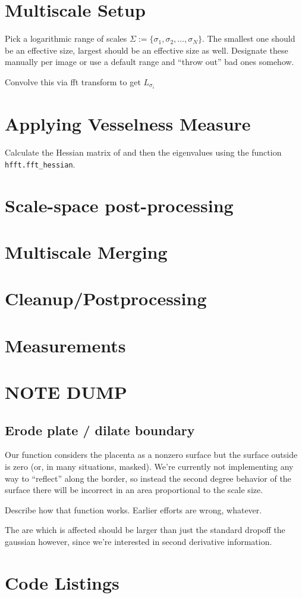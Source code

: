 \section{Multiscale Setup}

	Pick a logarithmic range of scales $\Sigma := \{ \sigma_1, \sigma_2, \dots, \sigma_N\}$.
	The smallest one should be an effective size, largest should be an effective size as well. Designate these manually per image or use a default range and ``throw out'' bad ones somehow.
	
	Convolve this via fft transform to get $L_{\sigma_i}$
	
\section{Applying Vesselness Measure}
Calculate the Hessian matrix of  and then the eigenvalues using the function \texttt{hfft.fft\_hessian}.

\section{Scale-space post-processing}
\section{Multiscale Merging}
\section{Cleanup/Postprocessing}
\section{Measurements}

\section{NOTE DUMP}
	
	\subsection{Erode plate / dilate boundary}
	
	Our function considers the placenta as a nonzero surface but the surface outside is zero (or, in many situations, masked). We're currently not implementing any way to ``reflect'' along the border, so instead the second degree behavior of the surface there will be incorrect in an area proportional to the scale size.
	
	Describe how that function works. Earlier efforts are wrong, whatever.
	
	The are which is affected should be larger than just the standard dropoff the gaussian however, since we're interested
	in second derivative information.
	
\section{Code Listings}

